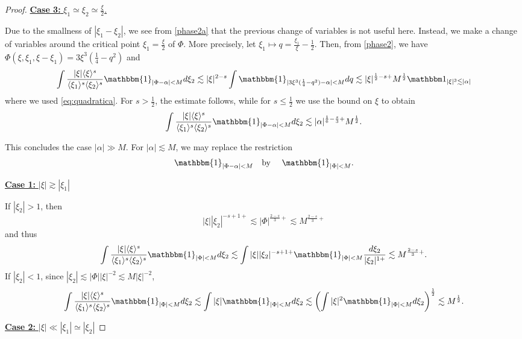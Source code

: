 \documentclass[%
11pt,  reqno]{amsart}
\newcommand{\fia}{\mathbbm{1}_{|\Phi-\alpha|<M}}
\newcommand{\jap}[1]{\langle #1 \rangle}
\newcommand{\5}{\textup{V}}
\newcommand{\noi}{\noindent}
\newcommand{\ind}{\mathbbm 1}
\newcommand{\les}{\lesssim}
\theoremstyle{remark}
\newcommand{\al}{\alpha}
\numberwithin{equation}{section}
\numberwithin{theorem}{section}
\begin{document}
\begin{proof}
\smallskip

\noi
\underline{
\textbf{Case 3:} $\xi_1\simeq \xi_2 \simeq \frac{\xi}{2}$.} 

Due to the smallness of $|\xi_1-\xi_2|$, we see from \eqref{phase2a} that the previous change of variables is not useful here. Instead,
we make a change of variables around the critical point $\xi_1 = \frac\xi2$ of $\Phi$. More precisely, let $\xi_1 \mapsto q = \frac{\xi_1}{\xi} - \frac12$. Then, from \eqref{phase2}, we have $\Phi (\xi, \xi_1,\xi-\xi_1)=  3 \xi^3 (\frac14 - q^2)$ and 
\begin{align*}
\int \frac{|\xi|\jap{\xi}^s}{\jap{\xi_1}^s\jap{\xi_2}^s}\fia d\xi_2 \lesssim |\xi|^{2-s}\int \mathbbm{1}_{|3 \xi^3 (\frac14 - q^2)-\alpha|<M}dq \les |\xi|^{\frac12-s +} M^\frac12  \ind_{|\xi|^3 \les |\al|}
\end{align*}
where we used \eqref{eq:quadratica}. For $s> \frac12$, the estimate follows, while for $s\le\frac12$ we use the bound on $\xi$ to obtain
\begin{align}
\int \frac{|\xi|\jap{\xi}^s}{\jap{\xi_1}^s\jap{\xi_2}^s}\fia d\xi_2 \les |\alpha|^{\frac16-\frac s3+} M^\frac12. 
\end{align}


\smallskip

This concludes the case $|\alpha|\gg M$. For $|\alpha|\lesssim M$, we may replace the restriction
$$
\fia \quad \mbox{by }\quad \mathbbm{1}_{|\Phi|<M}.
$$

\smallskip 
\noi
\underline{\textbf{Case 1:} $|\xi|\gtrsim |\xi_1|$} 

If $|\xi_2|>1$, then
$$
|\xi||\xi_2|^{-s+1+}\lesssim |\Phi|^{\frac{2-s}{3}+} \lesssim M^{\frac{2-s}{3}+}
$$
and thus
\begin{align}
\int \frac{|\xi|\jap{\xi}^s}{\jap{\xi_1}^s\jap{\xi_2}^s}\mathbbm{1}_{|\Phi|<M} d\xi_2 \les \int |\xi||\xi_2|^{-s+1+}\mathbbm{1}_{|\Phi|<M}\frac{d\xi_2}{|\xi_2|^{1+}}\lesssim M^{\frac{2-s}{3}+}.
\end{align}
If $|\xi_2|<1$, since $|\xi_2|\lesssim |\Phi||\xi|^{-2}\lesssim M|\xi|^{-2}$,
\begin{align}
\int \frac{|\xi|\jap{\xi}^s}{\jap{\xi_1}^s\jap{\xi_2}^s}\mathbbm{1}_{|\Phi|<M} d\xi_2 \les \int |\xi|\mathbbm{1}_{|\Phi|<M}d\xi_2\lesssim \left(\int |\xi|^2\mathbbm{1}_{|\Phi|<M} d\xi_2\right)^\frac12\lesssim M^{\frac12}.
\end{align}


\smallskip\noi
\underline{\textbf{Case 2:} $|\xi|\ll |\xi_1|\simeq |\xi_2|$} 


\end{proof}
\end{document}
